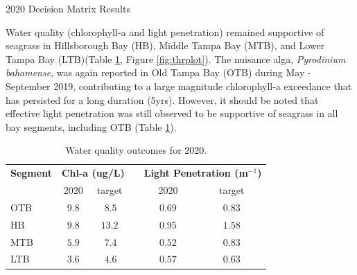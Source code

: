 \documentclass[final,t]{beamer}\usepackage[]{graphicx}\usepackage[]{color}
\begin{document}
\begin{frame}
\begin{columns}[t]
\begin{column}{.79\linewidth}
\begin{block}{2020 Decision Matrix Results}
\vspace{-0.1in}
\begin{minipage}{0.45\textwidth}
\footnotesize
Water quality (chlorophyll-a and light penetration) remained supportive of seagrass in Hillsborough Bay (HB), Middle Tampa Bay (MTB), and Lower Tampa Bay (LTB)(Table \ref{tab:segtab}, Figure \ref{fig:thrplot}). The nuisance alga, \textit{Pyrodinium bahamense}, was again reported in Old Tampa Bay (OTB) during May - September 2019, contributing to a large magnitude chlorophyll-a exceedance that has persisted for a long duration (5yrs). However, it should be noted that effective light penetration was still observed to be supportive of seagrass in all bay segments, including OTB (Table \ref{tab:segtab}).
\end{minipage}
\hspace{0.1in}
\begin{minipage}{0.5\textwidth}
\footnotesize
\begin{table}[!tbp]
\caption{{\footnotesize Water quality outcomes for 2020.}\label{tab:segtab}} 
\begin{center}
\begin{tabular}{lccccc}
\hline\hline
\multicolumn{1}{l}{\bfseries Segment}&\multicolumn{2}{c}{\bfseries Chl-a (ug/L)}&\multicolumn{1}{c}{\bfseries }&\multicolumn{2}{c}{\bfseries Light Penetration (m$^{-1}$)}\tabularnewline
\cline{2-3} \cline{5-6}
\multicolumn{1}{l}{}&\multicolumn{1}{c}{2020}&\multicolumn{1}{c}{target}&\multicolumn{1}{c}{}&\multicolumn{1}{c}{2020}&\multicolumn{1}{c}{target}\tabularnewline
\hline
\cellcolor{yellow}OTB&$9.8$&$~8.5$&&$0.69$&$0.83$\tabularnewline
\cellcolor{green}HB&$9.8$&$13.2$&&$0.95$&$1.58$\tabularnewline
\cellcolor{green}MTB&$5.9$&$~7.4$&&$0.52$&$0.83$\tabularnewline
\cellcolor{green}LTB&$3.6$&$~4.6$&&$0.57$&$0.63$\tabularnewline
\hline
\end{tabular}\end{center}
\end{table}

\end{minipage}

\end{block}

\vspace{-0.55in}


\end{column}
\end{columns}
\end{frame}
\end{document}
